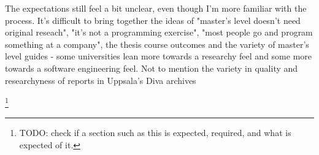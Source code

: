 \documentclass[a4paper]{report}
\newcommand{\todo}[1]{\footnote{{\color{red} TODO: #1}}}
\begin{document}
The expectations still feel a bit unclear, even though I'm more familiar with the process. It's difficult to bring together the ideas of "master's level doesn't need original reseach", "it's not a programming exercise", "most people go and program something at a company", the thesis course outcomes and the variety of master's level guides - some universities lean more towards a researchy feel and some more towards a software engineering feel. Not to mention the variety in quality and researchyness of reports in Uppsala's Diva archives

\todo{check if a section such as this is expected, required, and what is expected of it.}

\clearpage



\end{document}
